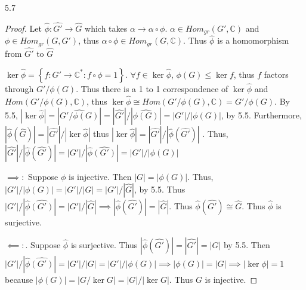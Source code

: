 \documentclass{article}
\newcommand{\C}{\mathbb{C}}
\begin{document}
\begin{PROB}{5.7}\label{Problem 5.7.}
\end{PROB}
\begin{proof}
    Let $\widehat{\phi}: \widehat{G'} \to \widehat{G}$ which takes $\alpha \to \alpha \circ \phi$. $\alpha \in Hom_{gr}(G', \C)$ and $\phi \in Hom_{gr}(G, G')$, thus $\alpha \circ \phi \in Hom_{gr}(G, \C)$. Thus $\widehat{\phi}$ is a homomorphism from $\widehat{G'}$ to $\widehat{G}$
        
    
    $\ker \widehat{\phi} = \left\{ f: G' \to \C^* : f \circ \phi = 1 \right\}$. $\forall f \in \ker \widehat{\phi}$, $\phi(G) \leq \ker f$, thus $f$ factors through $G' / \phi(G)$. Thus there is a 1 to 1 correspondence of $\ker \widehat{\phi}$ and $Hom(G' / \phi(G), \C)$, thus $\ker \widehat{\phi} \cong Hom(G' / \phi(G), \C) = \widehat{G' / \phi(G)}$. By 5.5, $|\ker \widehat{\phi}| = |\widehat{G' / \phi(G)}| = |\widehat{G'}| / |\widehat{\phi(G)}| = |G'| / |\phi(G)|$, by 5.5. Furthermore, $|\widehat{\phi}(\widehat{G})| = |\widehat{G'}| / |\ker \widehat{\phi}|$ thus $|\ker \widehat{\phi}| = |\widehat{G'}| / |\widehat{\phi}(\widehat{G'})|$ . Thus, $|\widehat{G'}| / |\widehat{\phi}(\widehat{G'})| = |G'| / |\widehat{\phi}\widehat{(G')}| = |G'| / |\phi(G)|$ 


    $\implies: $ Suppose $\phi$ is injective. Then $|G| = |\phi(G)|$. Thus, $|G'| / |\phi(G)| = |G'| / |G| = |G'| / |\widehat{G}|$, by 5.5. Thus $|G'| / |\widehat{\phi}\widehat{(G')}| = |G'| / |\widehat{G}|\implies |\widehat{\phi}(\widehat{G'})| = |\widehat{G}|$. Thus $\widehat{\phi}(\widehat{G'}) \cong \widehat{G}$. Thus $\widehat{\phi}$ is surjective. 
    
    
    $\impliedby: $. Suppose $\widehat{\phi}$ is surjective. Thus $|\widehat{\phi}(\widehat{G'})| = |\widehat{G'}| = |G| $ by 5.5.  Then $|G'| / |\widehat{\phi}\widehat{(G')}| = |G'| / |G| = |G'| / |\phi(G)|\implies |\phi(G)| = |G| \implies |\ker \phi| = 1$ because $|\phi(G)| = |G / \ker G| = |G| / |\ker G|$. Thus $G$ is injective.
\end{proof}
\end{document}
